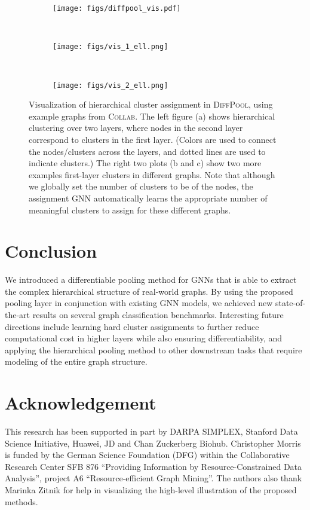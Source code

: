 \documentclass{article}
\newcommand{\name}{\textsc{DiffPool}\xspace}
\begin{document}
\begin{figure}[t!]
    \centering
    \begin{subfigure}[b]{0.45\textwidth}
        \centering
        \texttt{[image: figs/diffpool\_vis.pdf]}
        \caption{}
    \end{subfigure}
    ~
    \begin{subfigure}[b]{0.25\textwidth}
        \centering
        \texttt{[image: figs/vis\_1\_ell.png]}
                \caption{}
    \end{subfigure}~ 
    \begin{subfigure}[b]{0.25\textwidth}
        \centering
        \texttt{[image: figs/vis\_2\_ell.png]}
        \caption{}
    \end{subfigure}
    \caption{Visualization of hierarchical cluster assignment in \name, using example graphs from \textsc{Collab}.
      The left figure (a) shows hierarchical clustering over two layers, where nodes in the second layer correspond to clusters in the first layer. (Colors are used to connect the nodes/clusters across the layers, and dotted lines are used to indicate clusters.)
      The right two plots (b and c) show two more examples first-layer clusters in different graphs. 
      Note that although we globally set the number of clusters to be  of the nodes, the assignment GNN automatically learns the appropriate number of meaningful clusters to assign for these different graphs.}
        \label{fig:assignment_vis}
\end{figure}


 \section{Conclusion}

We introduced a differentiable pooling method for GNNs that is able to extract the complex hierarchical structure of real-world graphs. By using the proposed pooling layer in conjunction with existing GNN models, we achieved new state-of-the-art results on several graph classification benchmarks. 
Interesting future directions include learning hard cluster assignments to further reduce computational cost in higher layers while also ensuring differentiability, and applying the hierarchical pooling method to other downstream tasks that require modeling of the entire graph structure.


\section*{Acknowledgement}
This research has been supported in part by DARPA SIMPLEX, Stanford Data
Science Initiative, Huawei, JD and Chan Zuckerberg Biohub.
Christopher Morris is funded by the German Science Foundation (DFG) within the Collaborative Research Center SFB 876 “Providing Information by Resource-Constrained Data Analysis”, project A6 “Resource-efficient Graph Mining”. 
The authors also thank Marinka Zitnik for help in visualizing the high-level illustration of the proposed methods.




 



\end{document}
